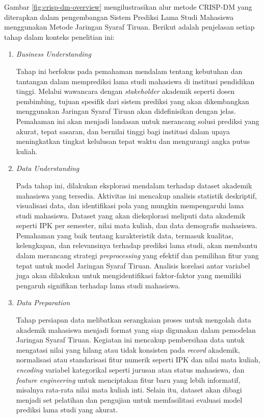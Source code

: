 \begin{enumerate}
    Gambar \ref{fig:crisp-dm-overview} mengilustrasikan alur metode CRISP-DM yang diterapkan dalam pengembangan Sistem Prediksi Lama Studi Mahasiswa menggunakan Metode Jaringan Syaraf Tiruan. Berikut adalah penjelasan setiap tahap dalam konteks penelitian ini:

    \begin{enumerate}
        \item \textit{Business Understanding}
        
        Tahap ini berfokus pada pemahaman mendalam tentang kebutuhan dan tantangan dalam memprediksi lama studi mahasiswa di institusi pendidikan tinggi. Melalui wawancara dengan \textit{stakeholder} akademik seperti dosen pembimbing, tujuan spesifik dari sistem prediksi yang akan dikembangkan menggunakan Jaringan Syaraf Tiruan akan didefinisikan dengan jelas. Pemahaman ini akan menjadi landasan untuk merancang solusi prediksi yang akurat, tepat sasaran, dan bernilai tinggi bagi institusi dalam upaya meningkatkan tingkat kelulusan tepat waktu dan mengurangi angka putus kuliah.

        \item \textit{Data Understanding}
        
        Pada tahap ini, dilakukan eksplorasi mendalam terhadap dataset akademik mahasiswa yang tersedia. Aktivitas ini mencakup analisis statistik deskriptif, visualisasi data, dan identifikasi pola yang mungkin mempengaruhi lama studi mahasiswa. Dataset yang akan dieksplorasi meliputi data akademik seperti IPK per semester, nilai mata kuliah, dan data demografis mahasiswa. Pemahaman yang baik tentang karakteristik data, termasuk kualitas, kelengkapan, dan relevansinya terhadap prediksi lama studi, akan membantu dalam merancang strategi \textit{preprocessing} yang efektif dan pemilihan fitur yang tepat untuk model Jaringan Syaraf Tiruan. Analisis korelasi antar variabel juga akan dilakukan untuk mengidentifikasi faktor-faktor yang memiliki pengaruh signifikan terhadap lama studi mahasiswa.

        \item \textit{Data Preparation}
        
        Tahap persiapan data melibatkan serangkaian proses untuk mengolah data akademik mahasiswa menjadi format yang siap digunakan dalam pemodelan Jaringan Syaraf Tiruan. Kegiatan ini mencakup pembersihan data untuk mengatasi nilai yang hilang atau tidak konsisten pada \textit{record} akademik, normalisasi atau standarisasi fitur numerik seperti IPK dan nilai mata kuliah, \textit{encoding} variabel kategorikal seperti jurusan atau status mahasiswa, dan \textit{feature engineering} untuk menciptakan fitur baru yang lebih informatif, misalnya rata-rata nilai mata kuliah inti. Selain itu, dataset akan dibagi menjadi set pelatihan dan pengujian untuk memfasilitasi evaluasi model prediksi lama studi yang akurat.


\end{enumerate}
\end{enumerate}
